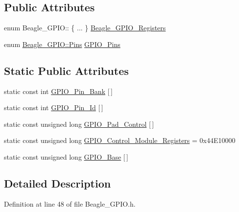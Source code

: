\subsection*{\-Public \-Attributes}
\begin{DoxyCompactItemize}
\item 
enum \-Beagle\-\_\-\-G\-P\-I\-O\-:: \{ ... \}  \hyperlink{class_beagle___g_p_i_o_a9f75d6e93d767194192f573ded387976}{\-Beagle\-\_\-\-G\-P\-I\-O\-\_\-\-Registers}
\item 
enum \hyperlink{class_beagle___g_p_i_o_a9b1fd560ea5d2d65898ac15c23055e58}{\-Beagle\-\_\-\-G\-P\-I\-O\-::\-Pins} \hyperlink{class_beagle___g_p_i_o_ae173a49845ccc4d980cc0eb83a990418}{\-G\-P\-I\-O\-\_\-\-Pins}
\end{DoxyCompactItemize}
\subsection*{\-Static \-Public \-Attributes}
\begin{DoxyCompactItemize}
\item 
static const int \hyperlink{class_beagle___g_p_i_o_ae7919c981429a17c48c601664a61d64a}{\-G\-P\-I\-O\-\_\-\-Pin\-\_\-\-Bank} \mbox{[}$\,$\mbox{]}
\item 
static const int \hyperlink{class_beagle___g_p_i_o_a9a48339b54de8e6c884ddad8629a3647}{\-G\-P\-I\-O\-\_\-\-Pin\-\_\-\-Id} \mbox{[}$\,$\mbox{]}
\item 
static const unsigned long \hyperlink{class_beagle___g_p_i_o_ae4a0a2a56a0ba31145a5f41eb3439886}{\-G\-P\-I\-O\-\_\-\-Pad\-\_\-\-Control} \mbox{[}$\,$\mbox{]}
\item 
static const unsigned long \hyperlink{class_beagle___g_p_i_o_a45dea13988842b47f592806fd15f1262}{\-G\-P\-I\-O\-\_\-\-Control\-\_\-\-Module\-\_\-\-Registers} = 0x44\-E10000
\item 
static const unsigned long \hyperlink{class_beagle___g_p_i_o_ab259232b938bf1892836737c07610384}{\-G\-P\-I\-O\-\_\-\-Base} \mbox{[}$\,$\mbox{]}
\end{DoxyCompactItemize}


\subsection{\-Detailed \-Description}


\-Definition at line 48 of file \-Beagle\-\_\-\-G\-P\-I\-O.\-h.



